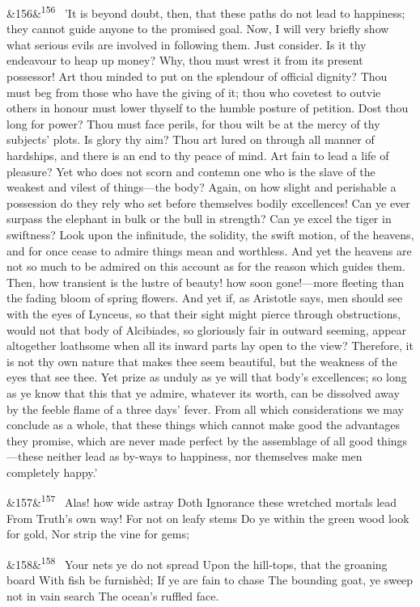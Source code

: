 \documentclass[12pt]{article}
\newcommand{\para}[1][]{\par\noindent\ifx&#1&\else\textsuperscript{\footnotesize #1}~\fi}
\begin{document}
\para[156] 'It is beyond doubt, then, that these paths do not lead to happiness; they cannot guide anyone to the promised goal. Now, I will very briefly show what serious evils are involved in following them. Just consider. Is it thy endeavour to heap up money? Why, thou must wrest it from its present possessor! Art thou minded to put on the splendour of official dignity? Thou must beg from those who have the giving of it; thou who covetest to outvie others in honour must lower thyself to the humble posture of petition. Dost thou long for power? Thou must face perils, for thou wilt be at the mercy of thy subjects' plots. Is glory thy aim? Thou art lured on through all manner of hardships, and there is an end to thy peace of mind. Art fain to lead a life of pleasure? Yet who does not scorn and contemn one who is the slave of the weakest and vilest of things---the body? Again, on how slight and perishable a possession do they rely who set before themselves bodily excellences! Can ye ever surpass the elephant in bulk or the bull in strength? Can ye excel the tiger in swiftness? Look upon the infinitude, the solidity, the swift motion, of the heavens, and for once cease to admire things mean and worthless. And yet the heavens are not so much to be admired on this account as for the reason which guides them. Then, how transient is the lustre of beauty! how soon gone!---more fleeting than the fading bloom of spring flowers. And yet if, as Aristotle says, men should see with the eyes of Lynceus, so that their sight might pierce through obstructions, would not that body of Alcibiades, so gloriously fair in outward seeming, appear altogether loathsome when all its inward parts lay open to the view? Therefore, it is not thy own nature that makes thee seem beautiful, but the weakness of the eyes that see thee. Yet prize as unduly as ye will that body's excellences; so long as ye know that this that ye admire, whatever its worth, can be dissolved away by the feeble flame of a three days' fever. From all which considerations we may conclude as a whole, that these things which cannot make good the advantages they promise, which are never made perfect by the assemblage of all good things---these neither lead as by-ways to happiness, nor themselves make men completely happy.'

\para[157] Alas! how wide astray Doth Ignorance these wretched mortals lead From Truth's own way! For not on leafy stems Do ye within the green wood look for gold, Nor strip the vine for gems;

\para[158] Your nets ye do not spread Upon the hill-tops, that the groaning board With fish be furnishèd; If ye are fain to chase The bounding goat, ye sweep not in vain search The ocean's ruffled face.
\end{document}
